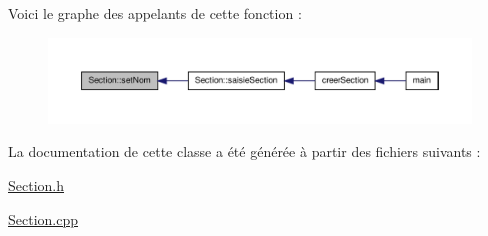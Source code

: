 Voici le graphe des appelants de cette fonction \-:
\nopagebreak
\begin{figure}[H]
\begin{center}
\leavevmode
\includegraphics[width=350pt]{class_section_a6d7313c0c0d9a1857db45f0b7978ebcc_icgraph}
\end{center}
\end{figure}




La documentation de cette classe a été générée à partir des fichiers suivants \-:\begin{DoxyCompactItemize}
\item 
\hyperlink{_section_8h}{Section.\-h}\item 
\hyperlink{_section_8cpp}{Section.\-cpp}\end{DoxyCompactItemize}
